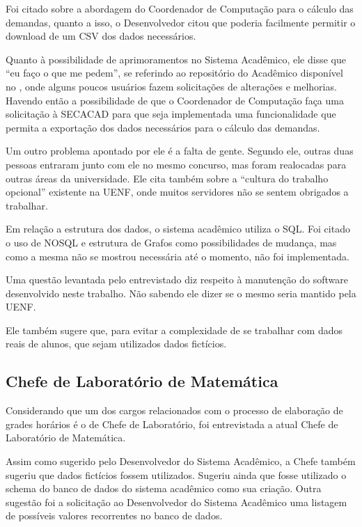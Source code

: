 Foi citado sobre a abordagem do Coordenador de Computação para o cálculo das demandas, quanto a isso, o Desenvolvedor citou que poderia facilmente permitir o download de um CSV dos dados necessários.

Quanto à possibilidade de aprimoramentos no Sistema Acadêmico, ele disse que ``eu faço o que me pedem'', se referindo ao repositório do Acadêmico disponível no , onde alguns poucos usuários fazem solicitações de alterações e melhorias. Havendo então a possibilidade de que o Coordenador de Computação faça uma solicitação à SECACAD para que seja implementada uma funcionalidade que permita a exportação dos dados necessários para o cálculo das demandas.

Um outro problema apontado por ele é a falta de gente. Segundo ele, outras duas pessoas entraram junto com ele no mesmo concurso, mas foram realocadas para outras áreas da universidade. Ele cita também sobre a ``cultura do trabalho opcional'' existente na UENF, onde muitos servidores não se sentem obrigados a trabalhar.

Em relação a estrutura dos dados, o sistema acadêmico utiliza o SQL. Foi citado o uso de NOSQL e estrutura de Grafos como possibilidades de mudança, mas como a mesma não se mostrou necessária até o momento, não foi implementada.

Uma questão levantada pelo entrevistado diz respeito à manutenção do software desenvolvido neste trabalho. Não sabendo ele dizer se o mesmo seria mantido pela UENF.

Ele também sugere que, para evitar a complexidade de se trabalhar com dados reais de alunos, que sejam utilizados dados fictícios.

\subsection{Chefe de Laboratório de Matemática} \label{subsec:3_Chefe} %

Considerando que um dos cargos relacionados com o processo de elaboração de grades horários é o de Chefe de Laboratório, foi entrevistada a atual Chefe de Laboratório de Matemática.

Assim como sugerido pelo Desenvolvedor do Sistema Acadêmico, a Chefe também sugeriu que dados fictícios fossem utilizados. Sugeriu ainda que fosse utilizado o schema do banco de dados do sistema acadêmico como sua criação. Outra sugestão foi a solicitação ao Desenvolvedor do Sistema Acadêmico uma listagem de possíveis valores recorrentes no banco de dados.

